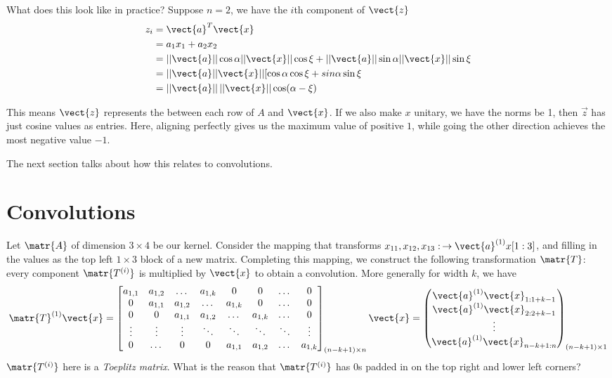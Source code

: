 What does this look like in practice?
Suppose $n=2$, we have the $i$th component of $\vect{z}$ 
\begin{align}
z_i & = \vect{a}^T\vect{x} \\
& = a_1x_1 + a_2x_2 \\
&= ||\vect{a}|| \cos \alpha ||\vect{x}|| \cos\xi + ||\vect{a}|| \sin \alpha  ||\vect{x}|| \sin\xi \\
&= ||\vect{a}||\vect{x}|| [\cos\alpha \cos\xi + sin\alpha \sin\xi \\
&=||\vect{a}||\,||\vect{x}||\cos(\alpha-\xi)
\end{align}


This means $\vect{z}$ represents the  between each row of $A$ and $\vect{x}$. If we also make $x$ unitary, we have the norms be 1, then $\vec{z}$ has just cosine values as entries. Here, aligning perfectly gives us the maximum value of positive $1$, while going the other direction achieves the most negative value $-1$.

The next section talks about how this relates to convolutions.
\section{Convolutions}
Let $\matr{A}$ of dimension $3\times 4$ be our kernel. Consider the mapping that transforms $x_{11}, x_{12}, x_{13}:\, \to \vect{a}^{(1)} x[1:3]$, and filling in the values as the top left $1\times 3$ block of a new matrix. Completing this mapping, we construct the following transformation $\matr{T}$: every component $\matr{T^{(i)}}$ is multiplied by $\vect{x}$ to obtain a convolution. More generally for width $k$, we have
\[
\matr{T}^{(1)}\vect{x} =
\begin{bmatrix}
    a_{1,1} & a_{1,2} & \dotsc & a_{1,k} & 0 & 0 & \dotsc & 0 \\
    0 & a_{1,1} & a_{1,2} & \dotsc & a_{1,k} & 0 & \dotsc & 0 \\
    0 & 0 & a_{1,1} & a_{1,2} & \dotsc & a_{1,k} & \dotsc & 0 \\
    \vdots & \vdots & \vdots & \ddots & \ddots & \ddots & \ddots & \vdots \\
    0 & \dotsc & 0 & 0 & a_{1,1} & a_{1,2} & \dotsc & a_{1,k}
\end{bmatrix}_{(n-k+1) \times n} \vect{x}=
\begin{pmatrix}
    \vect{a}^{(1)} \vect{x}_{1:1+k-1} \\ \vect{a}^{(1)} \vect{x}_{2:2+k-1} \\ \vdots \\ \vect{a}^{(1)}  \vect{x}_{n-k+1:n}
\end{pmatrix}_{(n-k+1) \times 1}
\]
$\matr{T^{(i)}}$ here is a \textit{Toeplitz matrix}. What is the reason that $\matr{T^{(i)}}$ has $0$s padded in on the top right and lower left corners?

